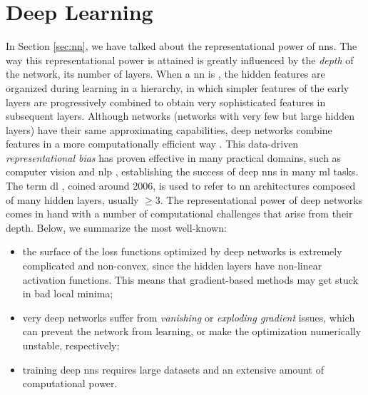 \section{Deep Learning}\label{sec:deep-learning}
In Section \ref{sec:nn}, we have talked about the representational power of \glspl{nn}. The way this representational power is attained is greatly influenced by the \emph{depth} of the network, \ie its number of layers. When a \gls{nn} is , the hidden features are organized during learning in a hierarchy, in which simpler features of the early layers are progressively combined to obtain very sophisticated features in subsequent layers. Although  networks (networks with very few but large hidden layers) have their same approximating capabilities, deep networks combine features in a more computationally efficient way \citep{bengio2009deeparch}. This data-driven \emph{representational bias} has proven effective in many practical domains, such as computer vision \citep{krizhevsky2017imagenet} and \gls{nlp} \citep{vaswani2017transformer}, establishing the success of deep \glspl{nn} in many \gls{ml} tasks. The term \gls{dl} \citep{goodfellow2016dl}, coined around 2006, is used to refer to \gls{nn} architectures composed of many hidden layers, usually $\geq 3$. The representational power of deep networks comes in hand with a number of computational challenges that arise from their depth. Below, we summarize the most well-known:
\begin{itemize}
    \item the surface of the loss functions optimized by deep networks is extremely complicated and non-convex, since the hidden layers have non-linear activation functions. This means that gradient-based methods may get stuck in bad local minima;
    \item very deep networks suffer from \emph{vanishing} or \emph{exploding gradient} issues, which can prevent the network from learning, or make the optimization numerically unstable, respectively;
    \item training deep \glspl{nn} requires large datasets and an extensive amount of computational power.
\end{itemize}
